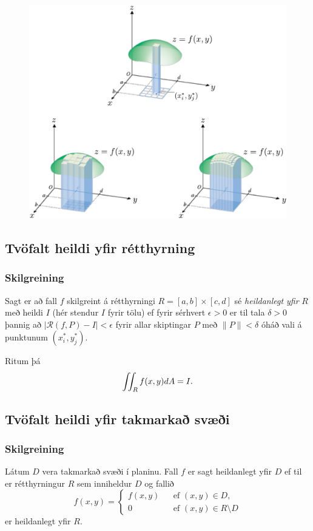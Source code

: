    \begin {figure}[h!]
 \centering
            \includegraphics[width=0.9\linewidth]{double.pdf}
            \caption*{}
\end {figure}



\subsection{\nopagebreak Tvöfalt heildi yfir rétthyrning} 

\subsubsection{\nopagebreak Skilgreining }
Sagt er að fall $f$ skilgreint á
rétthyrningi $R=[a,b]\times [c,d]$ sé {\em heildanlegt yfir} $R$ með
heildi $I$ (hér stendur $I$ fyrir tölu) ef fyrir sérhvert
$\epsilon>0$ er til tala $\delta>0$ 
þannig að $|\mathcal{R}(f,P)-I|<\epsilon$ fyrir allar skiptingar $P$ með
$\|P\|<\delta$ óháð vali á punktunum $(x_i^*, y_j^*)$.

Ritum þá 
$$\int\!\!\!\int_R f(x,y)dA=I.$$






\subsection{Tvöfalt heildi yfir takmarkað svæði} 

\subsubsection{Skilgreining }
Látum $D$ vera takmarkað svæði í planinu.
Fall $f$ er sagt heildanlegt yfir $D$ ef til er rétthyrningur $R$ sem
inniheldur $D$ og fallið 
$$\hat{f}(x,y)=\left\{\begin{array}{rcl}
f(x,y)& & \mbox{ef }(x,y)\in D,\\
0& & \mbox{ef }(x,y)\in R\setminus D
\end{array}\right.$$
er heildanlegt yfir $R$.





